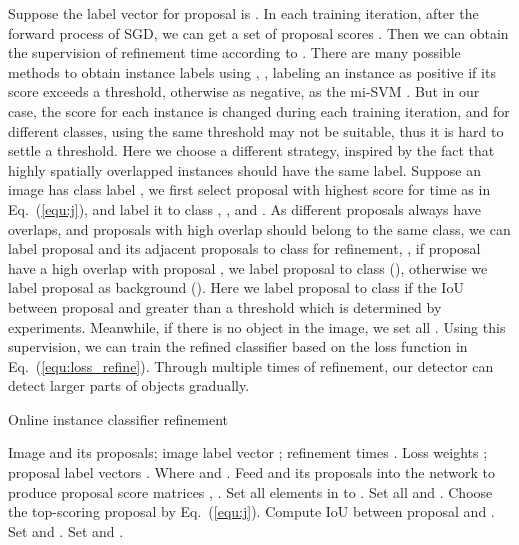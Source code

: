 \documentclass[10pt,twocolumn,letterpaper]{article}
\begin{document}
Suppose the label vector for proposal  is .
In each training iteration, after the forward process of SGD, we can get a set of proposal scores .
Then we can obtain the supervision of refinement time  according to .
There are many possible methods to obtain instance labels using , \eg, labeling an instance as positive if its score exceeds a threshold, otherwise as negative, as the mi-SVM \cite{Ref:Andrews2002}.
But in our case, the score for each instance is changed during each training iteration, and for different classes, using the same threshold may not be suitable, thus it is hard to settle a threshold.
Here we choose a different strategy, inspired by the fact that highly spatially overlapped instances should have the same label.
Suppose an image has class label , we first select proposal  with highest score for  time as in Eq.~(\ref{equ:j}), and label it to class , \ie,  and .
As different proposals always have overlaps, and proposals with high overlap should belong to the same class, we can label proposal  and its adjacent proposals to class  for  refinement, \ie, if proposal  have a high overlap with proposal , we label proposal  to class  (), otherwise we label proposal  as background ().
Here we label proposal  to class  if the IoU between proposal  and  greater than a threshold  which is determined by experiments.
Meanwhile, if there is no object  in the image, we set all .
Using this supervision, we can train the refined classifier based on the loss function in Eq.~(\ref{equ:loss_refine}).
Through multiple times of refinement, our detector can detect larger parts of objects gradually.






\begin{algorithm}[t]
\caption{Online instance classifier refinement}
\label{alg:oicr}
\begin{algorithmic}[1]
   \REQUIRE Image  and its proposals; image label vector ; refinement times .
   \ENSURE Loss weights ; proposal label vectors . Where  and .
   \STATE Feed  and its proposals into the network to produce proposal score matrices  , .
   \FOR{ \TO }
   \STATE Set all elements in  to .
   \STATE Set all  and .
      \FOR{ \TO }
         \IF{}
            \STATE  Choose the top-scoring proposal  by Eq.~(\ref{equ:j}).
            \FOR{ \TO }
               \STATE Compute IoU  between proposal  and .
               \IF{}
                  \STATE Set  and .
                  \IF{}
                     \STATE Set  and .
                  \ENDIF
               \ENDIF
            \ENDFOR
         \ENDIF
      \ENDFOR
   \ENDFOR
\end{algorithmic}
\end{algorithm}
\end{document}
